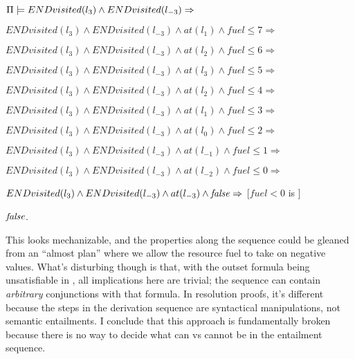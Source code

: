 $\Pi \models END visited(l_{3}) \wedge END visited(l_{-3}) \Rightarrow$ 

$END visited(l_{3}) \wedge END visited(l_{-3}) \wedge at(l_{1})
\wedge fuel \leq 7 \Rightarrow$

$END visited(l_{3}) \wedge END visited(l_{-3}) \wedge at(l_{2})
\wedge fuel \leq 6 \Rightarrow$

$END visited(l_{3}) \wedge END visited(l_{-3}) \wedge at(l_{3})
\wedge fuel \leq 5 \Rightarrow$

$END visited(l_{3}) \wedge END visited(l_{-3}) \wedge at(l_{2})
\wedge fuel \leq 4 \Rightarrow$

$END visited(l_{3}) \wedge END visited(l_{-3}) \wedge at(l_{1})
\wedge fuel \leq 3 \Rightarrow$

$END visited(l_{3}) \wedge END visited(l_{-3}) \wedge at(l_{0})
\wedge fuel \leq 2 \Rightarrow$

$END visited(l_{3}) \wedge END visited(l_{-3}) \wedge at(l_{-1})
\wedge fuel \leq 1 \Rightarrow$

$END visited(l_{3}) \wedge END visited(l_{-3}) \wedge at(l_{-2})
\wedge fuel \leq 0 \Rightarrow$

$END visited(l_{3}) \wedge END visited(l_{-3}) \wedge at(l_{-3})
\wedge \mathit{false} \Rightarrow$ [$fuel < 0$ is \false]

$\mathit{false}$.

This looks mechanizable, and the properties along the sequence could
be gleaned from an ``almost plan'' where we allow the resource fuel to
take on negative values. What's disturbing though is that, with the
outset formula being unsatisfiable in \plans, all implications here
are trivial; the sequence can contain \emph{arbitrary} conjunctions
with that formula. In resolution proofs, it's different because the
steps in the derivation sequence are syntactical manipulations, not
semantic entailments. I conclude that this approach is fundamentally
broken because there is no way to decide what can vs cannot be in the
entailment sequence.



%
%



